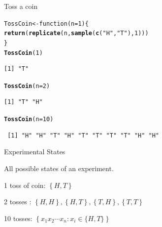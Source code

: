 \documentclass{beamer}\usepackage[]{graphicx}\usepackage[]{color}
\makeatletter
\newcommand{\hlnum}[1]{\textcolor[rgb]{0.2,0.2,0.2}{#1}}%
\newcommand{\hlstr}[1]{\textcolor[rgb]{0.2,0.2,0.2}{#1}}%
\newcommand{\hlstd}[1]{\textcolor[rgb]{0.102,0.102,0.102}{#1}}%
\newcommand{\hlkwa}[1]{\textcolor[rgb]{0.102,0.102,0.102}{#1}}%
\newcommand{\hlkwb}[1]{\textcolor[rgb]{0.102,0.102,0.102}{#1}}%
\newcommand{\hlkwc}[1]{\textcolor[rgb]{0.2,0.2,0.2}{#1}}%
\newcommand{\hlkwd}[1]{\textcolor[rgb]{0.102,0.102,0.102}{\textbf{#1}}}%
\newenvironment{kframe}{%
 \def\at@end@of@kframe{}%
 \ifinner\ifhmode%
  \def\at@end@of@kframe{\end{minipage}}%
  \begin{minipage}{\columnwidth}%
 \fi\fi%
 \def\FrameCommand##1{\hskip\@totalleftmargin \hskip-\fboxsep
 \colorbox{shadecolor}{##1}\hskip-\fboxsep
     \hskip-\linewidth \hskip-\@totalleftmargin \hskip\columnwidth}%
 \MakeFramed {\advance\hsize-\width
   \@totalleftmargin\z@ \linewidth\hsize
   \@setminipage}}%
 {\par\unskip\endMakeFramed%
 \at@end@of@kframe}
\newenvironment{knitrout}{}{} %
\renewenvironment{knitrout}{\begin{spacing}{0.75}\begin{tiny}}{\end{tiny}\end{spacing}}
\makeatother
\begin{document}
\begin{frame}[fragile]{Toss a coin \;\;}

\begin{knitrout}\small
{}\color{fgcolor}\begin{kframe}
\begin{alltt}
\hlstd{TossCoin} \hlkwb{<-} \hlkwa{function}\hlstd{(}\hlkwc{n}\hlstd{=}\hlnum{1}\hlstd{)\{}
    \hlkwd{return}\hlstd{(}\hlkwd{replicate}\hlstd{(n,} \hlkwd{sample}\hlstd{(}\hlkwd{c}\hlstd{(}\hlstr{"H"}\hlstd{,}\hlstr{"T"}\hlstd{),}\hlnum{1}\hlstd{)))}
\hlstd{\}}
\hlkwd{TossCoin}\hlstd{(}\hlnum{1}\hlstd{)}
\end{alltt}
\begin{verbatim}
[1] "T"
\end{verbatim}
\begin{alltt}
\hlkwd{TossCoin}\hlstd{(}\hlkwc{n}\hlstd{=}\hlnum{2}\hlstd{)}
\end{alltt}
\begin{verbatim}
[1] "T" "H"
\end{verbatim}
\begin{alltt}
\hlkwd{TossCoin}\hlstd{(}\hlkwc{n}\hlstd{=}\hlnum{10}\hlstd{)}
\end{alltt}
\begin{verbatim}
 [1] "H" "H" "T" "H" "T" "T" "T" "T" "H" "H"
\end{verbatim}
\end{kframe}
\end{knitrout}

\end{frame}

\begin{frame}[fragile]{Experimental States \;\;}

All possible states of an experiment.

1 toss of coin: $\left \{ H, T  \right \}$ \pause \newline

2 tosses : $\left \{H, H \right \}, \left \{H, T \right \}, \left \{T, H \right \},
            \left \{T, T \right \}$ \pause \newline

10 tosses: $\left\{x_{1}x_{2} \cdots x_{n} : x_{i} \in \{H,T \} \right \}$

\end{frame}
\end{document}
